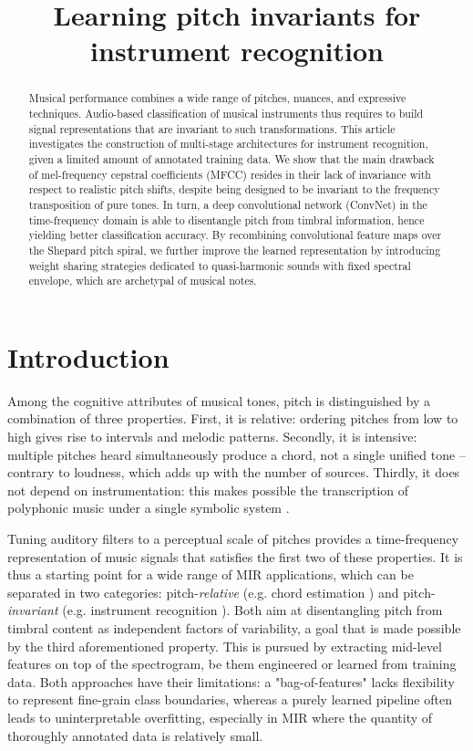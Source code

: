 \documentclass{article}
\title{Learning pitch invariants for instrument recognition}
\makeatletter
\newcommand*{\eg}{e.g.\@\xspace}
\makeatother
\begin{document}
%
\maketitle
%
\begin{abstract}
Musical performance combines a wide range of pitches, nuances,
and expressive techniques.
Audio-based classification of musical instruments thus requires to
build signal representations that are invariant to such transformations.
This article investigates the construction
of multi-stage architectures for instrument recognition,
given a limited amount of annotated training data.
We show that the main drawback of mel-frequency cepstral
coefficients (MFCC) resides in their lack of invariance with respect to
realistic pitch shifts, despite being designed to be invariant
to the frequency transposition of pure tones.
In turn, a deep convolutional network (ConvNet)
in the time-frequency domain is able to disentangle pitch from
timbral information, hence yielding better classification accuracy.
By recombining convolutional feature maps over the Shepard pitch spiral,
we further improve the learned representation
by introducing weight sharing strategies dedicated to
quasi-harmonic sounds with fixed spectral envelope,
which are archetypal of musical notes.
\end{abstract}

\section{Introduction}\label{sec:introduction}
Among the cognitive attributes of musical tones, pitch is distinguished
by a combination of three properties.
First, it is relative: ordering pitches from low to high gives rise to
intervals and melodic patterns.
Secondly, it is intensive: multiple pitches heard simultaneously produce
a chord, not a single unified tone -- contrary to loudness, which adds
up with the number of sources.
Thirdly, it does not depend on instrumentation: this makes possible
the transcription of polyphonic music under a single symbolic system
\cite{deCheveigne2005}.

Tuning auditory filters to a perceptual scale of pitches provides a
time-frequency representation of music signals that satisfies the first two of these properties.
It is thus a starting point for a wide range of MIR applications,
which can be separated in two categories: pitch-\emph{relative}
(\eg chord estimation \cite{Humphrey2012tonnetz})
and pitch-\emph{invariant} (\eg instrument recognition \cite{Eronen2000}).
Both aim at disentangling pitch from timbral content as independent
factors of variability, a goal that is made possible by the third aforementioned property.
This is pursued by extracting mid-level features on top of the spectrogram,
be them engineered or learned from training data.
Both approaches have their limitations: a "bag-of-features" lacks flexibility
to represent fine-grain class boundaries, whereas a purely learned pipeline
often leads to uninterpretable overfitting, especially in MIR where the quantity
of thoroughly annotated data is relatively small.
\end{document}
